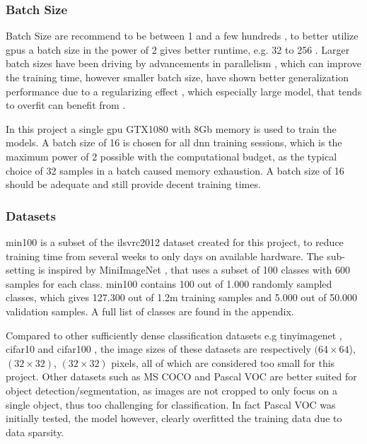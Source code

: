 \subsubsection{Batch Size}

Batch Size are recommend to be between 1 and a few hundreds \cite{bengio_practical_2012}, to better utilize \gls{gpu}s a batch size in the power of 2 gives better runtime, e.g. 32 to 256 \cite{goodfellow_deep_2016}. Larger batch sizes have been driving by advancements in parallelism \cite{dean_large_2012}, which can improve the training time, however smaller batch size, have shown better generalization performance due to a regularizing effect \cite{masters_revisiting_nodate}, which especially large model, that tends to overfit can benefit from \cite{goodfellow_deep_2016}. 

In this project a single \gls{gpu} GTX1080 with 8Gb memory is used to train the models. A batch size of 16 is chosen for all \gls{dnn} training sessions, which is the maximum power of 2 possible with the computational budget, as the typical choice of 32 samples in a batch caused memory exhaustion. A batch size of 16 should be adequate and still provide decent training times. 

\subsubsection{Datasets}

\gls{min100} is a subset of the \gls{ilsvrc2012} dataset \cite{russakovsky_imagenet_2015} created for this project, to reduce training time from several weeks to only days on available hardware. The sub-setting is inspired by MiniImageNet \cite{vinyals_matching_2016}, that uses a subset of 100 classes with 600 samples for each class. \gls{min100} contains 100 out of 1.000 randomly sampled classes, which gives 127.300 out of 1.2m training samples and 5.000 out of 50.000 validation samples. A full list of classes are found in the appendix. 

Compared to other sufficiently dense classification datasets e.g \gls{tinyimagenet} \cite{li_cs231n:_2018}, \gls{cifar10} and \gls{cifar100} \cite{krizhevsky_cifar-10_nodate}, the image sizes of these datasets are respectively $(64\times 64$), $(32\times 32)$, $(32\times 32)$ pixels, all of which are considered too small  for this project. Other datasets such as MS COCO and Pascal VOC are better suited for object detection/segmentation, as images are not cropped to only focus on a single object, thus too challenging for classification. In fact Pascal VOC was initially tested, the model however, clearly overfitted the training data due to data sparsity. 

